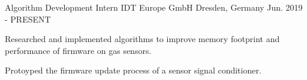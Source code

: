 

\begin{cventries}

\cventry
{Algorithm Development Intern} %
{IDT Europe GmbH} %
{Dresden, Germany} %
{Jun. 2019 - PRESENT} %
{
  \begin{cvitems} %
    \item {Researched and implemented algorithms to improve memory footprint and performance of firmware on gas sensors.}
    \item {Protoyped the firmware update process of a sensor signal conditioner.}
  \end{cvitems}
}
\end{cventries}
